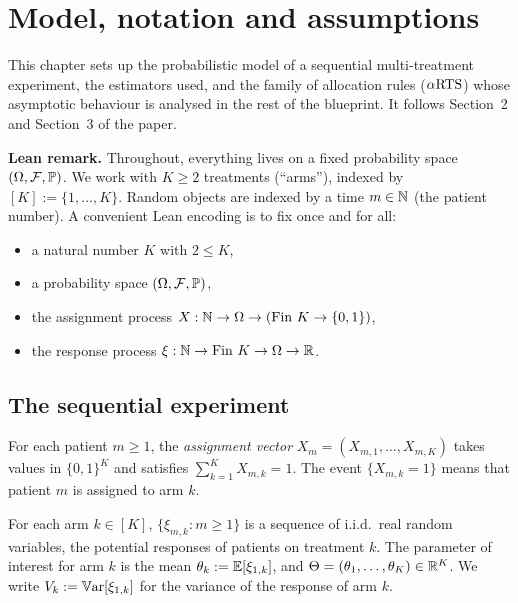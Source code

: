 \chapter{Model, notation and assumptions}
\label{chap:model}

This chapter sets up the probabilistic model of a sequential multi-treatment
experiment, the estimators used, and the family of allocation rules
($\alpha\text{RTS}$) whose asymptotic behaviour is analysed in the rest of the blueprint.
It follows Section~2 and Section~3 of the paper.

\textbf{Lean remark.}
Throughout, everything lives on a fixed probability space $(\Omega, \mathcal{F}, \mathbb{P})$.
We work with $K \geq 2$ treatments (``arms''), indexed by $[K] := \{1, \dots, K\}$.
Random objects are indexed by a time $m \in \mathbb{N}$ (the patient number).
A convenient Lean encoding is to fix once and for all:
\begin{itemize}
  \item a natural number $K$ with $2 \le K$,
  \item a probability space $(\Omega, \mathcal{F}, \mathbb{P})$,
  \item the assignment process $X : \mathbb{N} \to \Omega \to (\text{Fin } K \to \{0,1\})$,
  \item the response process $\xi : \mathbb{N} \to \text{Fin } K \to \Omega \to \mathbb{R}$.
\end{itemize}

\section{The sequential experiment}
\label{sec:model_experiment}

\begin{definition}\label{def:assignment}
\leanok
For each patient $m \ge 1$, the \emph{assignment vector}
$X_m = (X_{m,1}, \dots, X_{m,K})$ takes values in $\{0,1\}^K$ and satisfies
$\sum_{k=1}^K X_{m,k} = 1$. The event $\{X_{m,k} = 1\}$ means that patient $m$ is
assigned to arm $k$.
\end{definition}

\begin{definition}\label{def:responses}
For each arm $k \in [K]$, $\{\xi_{m,k} : m \ge 1\}$ is a sequence of i.i.d.\
real random variables, the potential responses of patients on treatment $k$.
The parameter of interest for arm $k$ is the mean
$\theta_k := \mathbb{E}[\xi_{1,k}]$, and $\Theta = (\theta_1, \dots, \theta_K) \in \mathbb{R}^K$.
We write $V_k := \mathbb{V}\mathrm{ar}[\xi_{1,k}]$ for the variance of the response of arm $k$.
\end{definition}

